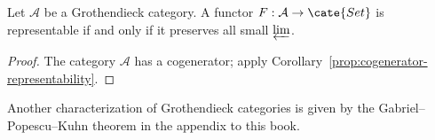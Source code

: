\begin{corollary}\label{prop:Grothendieck-cat-rep2}
	Let $\mathcal{A}$ be a Grothendieck category. A functor
	$F:\mathcal{A}\to\cate{Set}$ is representable if and only if it preserves
	all small $\varprojlim$.
\end{corollary}
\begin{proof}
	The category $\mathcal{A}$ has a cogenerator; apply
	Corollary~\ref{prop:cogenerator-representability}.
\end{proof}

Another characterization of Grothendieck categories is given by the
Gabriel--Popescu--Kuhn theorem  in the appendix
to this book.

\vfill

